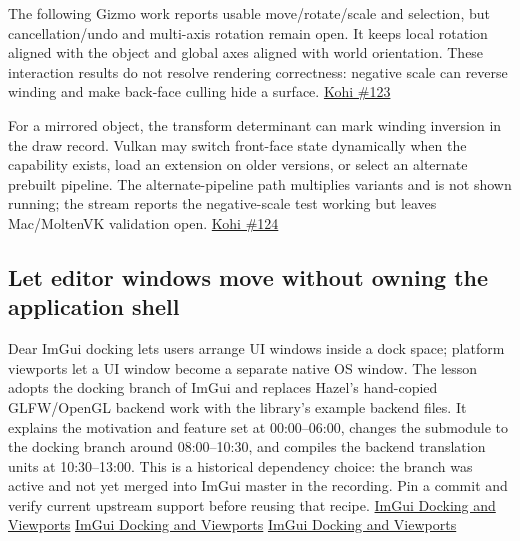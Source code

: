 The following Gizmo work reports usable move/rotate/scale and selection, but cancellation/undo and multi-axis rotation remain open. It keeps local rotation aligned with the object and global axes aligned with world orientation. These interaction results do not resolve rendering correctness: negative scale can reverse winding and make back-face culling hide a surface. \href{https://www.youtube.com/watch?v=SdMihp51X_o}{Kohi \#123}

For a mirrored object, the transform determinant can mark winding inversion in the draw record. Vulkan may switch front-face state dynamically when the capability exists, load an extension on older versions, or select an alternate prebuilt pipeline. The alternate-pipeline path multiplies variants and is not shown running; the stream reports the negative-scale test working but leaves Mac/MoltenVK validation open. \href{https://www.youtube.com/watch?v=sCX_Sw0G4Ag}{Kohi \#124}

\subsection{Let editor windows move without owning the application shell}\label{06-engine-ii-ch032-let-editor-windows-move-without-owning-the-application-shell}

\hypertarget{06-engine-ii-ch032-let-editor-windows-move-without-owning-the-application-shell}{}

Dear ImGui docking lets users arrange UI windows inside a dock space; platform viewports let a UI window become a separate native OS window. The lesson adopts the docking branch of ImGui and replaces Hazel's hand-copied GLFW/OpenGL backend work with the library's example backend files. It explains the motivation and feature set at 00:00--06:00, changes the submodule to the docking branch around 08:00--10:30, and compiles the backend translation units at 10:30--13:00. This is a historical dependency choice: the branch was active and not yet merged into ImGui master in the recording. Pin a commit and verify current upstream support before reusing that recipe. \href{https://www.youtube.com/watch?v=lZuje-3iyVE&t=0s}{ImGui Docking and Viewports} \href{https://www.youtube.com/watch?v=lZuje-3iyVE&t=480s}{ImGui Docking and Viewports} \href{https://www.youtube.com/watch?v=lZuje-3iyVE&t=630s}{ImGui Docking and Viewports}

